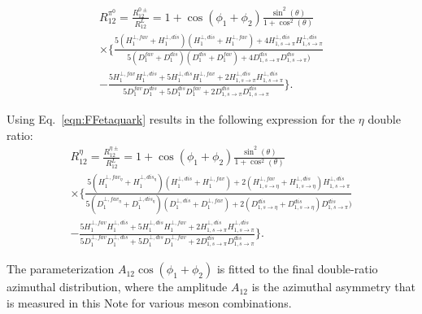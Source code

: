 \begin{multline}
R_{12}^{\pi^0}=\frac{R^{0\pm}_{12}}{R^L_{12}}=1+\cos(\phi_1+\phi_2)\frac{\sin^2(\theta)}{1+\cos^2(\theta)} \\
\times\bigg\{\frac{5(H^{\bot,fav}_1+H^{\bot,dis}_1)(H^{\bot,dis}_1+H^{\bot,fav}_1)+4H^{\bot,dis}_{1,s\rightarrow\pi}H^{\bot,dis}_{1,s\rightarrow\pi}}{5(D^{fav}_1+D^{dis}_1)(D^{dis}_1+D^{fav}_1)+4D^{dis}_{1,s\rightarrow\pi}D^{dis}_{1,s\rightarrow\pi})}\\
-\frac{5H^{\bot,fav}_1H^{\bot,dis}_1+5H^{\bot,dis}_1H^{\bot,fav}_1+2H^{\bot,dis}_{1,s\rightarrow\pi}H^{\bot,dis}_{1,s\rightarrow\pi}}{5D^{fav}_1D^{dis}_1+5D^{dis}_1D^{fav}_1+2D^{dis}_{1,s\rightarrow\pi}D^{dis}_{1,s\rightarrow\pi}} \bigg\}.
\label{eqn:FF5}
\end{multline}


Using Eq.~\eqref{eqn:FFetaquark} results in the following expression for the \(\eta\) double ratio:
\begin{multline}
R_{12}^{\eta}=\frac{R^{\eta\pm}_{12}}{R^L_{12}}=1+\cos(\phi_1+\phi_2)\frac{\sin^2(\theta)}{1+\cos^2(\theta)} \\
\times\bigg\{\frac{5(H^{\bot,fav_\eta}_1+H^{\bot,dis_\eta}_1)(H^{\bot,dis}_1+H^{\bot,fav}_1)+2(H^{\bot,fav}_{1,s\rightarrow\eta}+H^{\bot,dis}_{1,s\rightarrow\eta})H^{\bot,dis}_{1,s\rightarrow\pi}}{5(D^{\bot,fav_\eta}_1+D^{\bot,dis_\eta}_1)(D^{\bot,dis}_1+D^{\bot,fav}_1)+2(D^{dis}_{1,s\rightarrow\eta}+D^{dis}_{1,s\rightarrow\eta})D^{dis}_{1,s\rightarrow\pi})}\\
-\frac{5H^{\bot,fav}_1H^{\bot,dis}_1+5H^{\bot,dis}_1H^{\bot,fav}_1+2H^{\bot,dis}_{1,s\rightarrow\pi}H^{\bot,dis}_{1,s\rightarrow\pi}}{5D^{\bot,fav}_1D^{\bot,dis}_1+5D^{\bot,dis}_1D^{\bot,fav}_1+2D^{dis}_{1,s\rightarrow\pi}D^{dis}_{1,s\rightarrow\pi}} \bigg\}.
\label{eqn:FF5eta}
\end{multline}

The parameterization $A_{12} \cos(\phi_1+\phi_2)$ is fitted to the final double-ratio azimuthal distribution, where the amplitude $A_{12}$ is the azimuthal asymmetry that is measured in this Note for various meson combinations. 